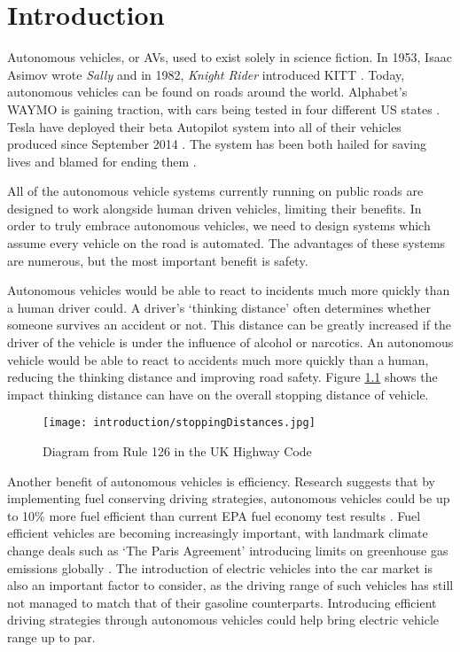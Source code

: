 \chapter{Introduction}
\label{cha:Introduction}

Autonomous vehicles, or AVs, used to exist solely in science fiction. In 1953, Isaac Asimov wrote \emph{Sally} \citep{Asimov1953} and in 1982, \emph{Knight Rider} introduced KITT \citep{Kitt1982}. Today, autonomous vehicles can be found on roads around the world. Alphabet's WAYMO is gaining traction, with cars being tested in four different US states \citep{Waymo2016}. Tesla have deployed their beta Autopilot system into all of their vehicles produced since September 2014 \citep{TeslaAutoPressKit}. The system has been both hailed for saving lives and blamed for ending them \citep{TeslaHospital} \citep{TeslaUnderInvestigation}.

All of the autonomous vehicle systems currently running on public roads are designed to work alongside human driven vehicles, limiting their benefits. In order to truly embrace autonomous vehicles, we need to design systems which assume every vehicle on the road is automated. The advantages of these systems are numerous, but the most important benefit is safety.

Autonomous vehicles would be able to react to incidents much more quickly than a human driver could. A driver's `thinking distance' often determines whether someone survives an accident or not. This distance can be greatly increased if the driver of the vehicle is under the influence of alcohol or narcotics. An autonomous vehicle would be able to react to accidents much more quickly than a human, reducing the thinking distance and improving road safety. Figure \ref{fig:StoppingDistances} shows the impact thinking distance can have on the overall stopping distance of vehicle.

\begin{figure}[htb]
\centerline{
\texttt{[image: introduction/stoppingDistances.jpg]}
}
\caption{Diagram from Rule 126 in the UK Highway Code \citep{StoppingDistances}}
\label{fig:StoppingDistances}
\end{figure}

Another benefit of autonomous vehicles is efficiency. Research suggests that by implementing fuel conserving driving strategies, autonomous vehicles could be up to 10\% more fuel efficient than current EPA fuel economy test results \citep{Mersky2016}. Fuel efficient vehicles are becoming increasingly important, with landmark climate change deals such as `The Paris Agreement' introducing limits on greenhouse gas emissions globally \citep{Paris2016}. The introduction of electric vehicles into the car market is also an important factor to consider, as the driving range of such vehicles has still not managed to match that of their gasoline counterparts. Introducing efficient driving strategies through autonomous vehicles could help bring electric vehicle range up to par.

